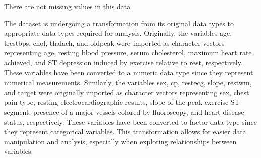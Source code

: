 \documentclass[
]{article}
\begin{document}
There are not missing values in this data.

The dataset is undergoing a transformation from its original data types
to appropriate data types required for analysis. Originally, the
variables age, trestbps, chol, thalach, and oldpeak were imported as
character vectors representing age, resting blood pressure, serum
cholesterol, maximum heart rate achieved, and ST depression induced by
exercise relative to rest, respectively. These variables have been
converted to a numeric data type since they represent numerical
measurements. Similarly, the variables sex, cp, restecg, slope, restwm,
and target were originally imported as character vectors representing
sex, chest pain type, resting electrocardiographic results, slope of the
peak exercise ST segment, presence of a major vessels colored by
fluoroscopy, and heart disease status, respectively. These variables
have been converted to factor data type since they represent categorical
variables. This transformation allows for easier data manipulation and
analysis, especially when exploring relationships between variables.
\end{document}
